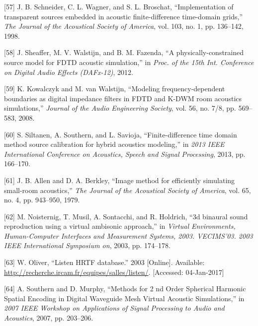 \documentclass[]{scrreprt}
\begin{document}
\hypertarget{ref-schneiderux5fimplementationux5f1998}{}
{[}57{]} J. B. Schneider, C. L. Wagner, and S. L. Broschat,
``Implementation of transparent sources embedded in acoustic
finite-difference time-domain grids,'' \emph{The Journal of the
Acoustical Society of America}, vol. 103, no. 1, pp. 136--142, 1998.

\hypertarget{ref-sheafferux5fphysically-constrainedux5f2012}{}
{[}58{]} J. Sheaffer, M. V. Walstijn, and B. M. Fazenda, ``A
physically-constrained source model for FDTD acoustic simulation,'' in
\emph{Proc. of the 15th Int. Conference on Digital Audio Effects
(DAFx-12)}, 2012.

\hypertarget{ref-kowalczykux5fmodelingux5f2008}{}
{[}59{]} K. Kowalczyk and M. van Walstijn, ``Modeling
frequency-dependent boundaries as digital impedance filters in FDTD and
K-DWM room acoustics simulations,'' \emph{Journal of the Audio
Engineering Society}, vol. 56, no. 7/8, pp. 569--583, 2008.

\hypertarget{ref-siltanenux5ffinite-differenceux5f2013}{}
{[}60{]} S. Siltanen, A. Southern, and L. Savioja, ``Finite-difference
time domain method source calibration for hybrid acoustics modeling,''
in \emph{2013 IEEE International Conference on Acoustics, Speech and
Signal Processing}, 2013, pp. 166--170.

\hypertarget{ref-allenux5fimageux5f1979}{}
{[}61{]} J. B. Allen and D. A. Berkley, ``Image method for efficiently
simulating small-room acoustics,'' \emph{The Journal of the Acoustical
Society of America}, vol. 65, no. 4, pp. 943--950, 1979.

\hypertarget{ref-noisternigux5f3dux5f2003}{}
{[}62{]} M. Noisternig, T. Musil, A. Sontacchi, and R. Holdrich, ``3d
binaural sound reproduction using a virtual ambisonic approach,'' in
\emph{Virtual Environments, Human-Computer Interfaces and Measurement
Systems, 2003. VECIMS'03. 2003 IEEE International Symposium on}, 2003,
pp. 174--178.

\hypertarget{ref-oliverux5flistenux5f2003}{}
{[}63{]} W. Oliver, ``Listen HRTF database.'' 2003 {[}Online{]}.
Available: \url{http://recherche.ircam.fr/equipes/salles/listen/}.
{[}Accessed: 04-Jan-2017{]}

\hypertarget{ref-southernux5fmethodsux5f2007}{}
{[}64{]} A. Southern and D. Murphy, ``Methods for 2 nd Order Spherical
Harmonic Spatial Encoding in Digital Waveguide Mesh Virtual Acoustic
Simulations,'' in \emph{2007 IEEE Workshop on Applications of Signal
Processing to Audio and Acoustics}, 2007, pp. 203--206.
\end{document}
